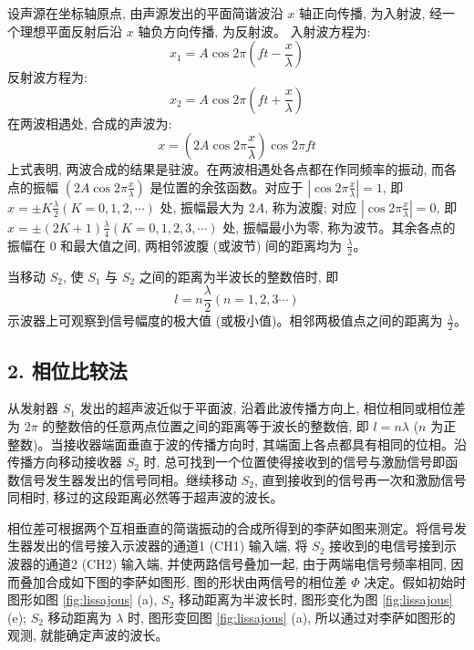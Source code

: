 \documentclass[12pt,a4paper]{article}
\begin{document}
设声源在坐标轴原点, 由声源发出的平面简谐波沿 $x$ 轴正向传播, 为入射波, 经一个理想平面反射后沿 $x$ 轴负方向传播, 为反射波。
入射波方程为:
\begin{equation} \label{eq:incident}
x_{1}=A\cos 2\pi\left(ft-\frac{x}{\lambda}\right)
\end{equation}
反射波方程为:
\begin{equation} \label{eq:reflected}
x_{2}=A\cos 2\pi\left(ft+\frac{x}{\lambda}\right)
\end{equation}
在两波相遇处, 合成的声波为:
\begin{equation} \label{eq:standing_wave}
x=\left(2A\cos 2\pi\frac{x}{\lambda}\right)\cos 2\pi ft
\end{equation}
上式表明, 两波合成的结果是驻波。在两波相遇处各点都在作同频率的振动, 而各点的振幅 $\left(2A\cos 2\pi\frac{x}{\lambda}\right)$ 是位置的余弦函数。对应于 $\left|\cos 2\pi\frac{x}{\lambda}\right|=1$, 即 $x=\pm K\frac{\lambda}{2}(K=0,1,2,\cdots)$ 处, 振幅最大为 $2A$, 称为波腹; 对应 $\left|\cos 2\pi\frac{x}{\lambda}\right|=0$, 即 $x=\pm(2K+1)\frac{\lambda}{4}(K=0,1,2,3,\cdots)$ 处, 振幅最小为零, 称为波节。其余各点的振幅在 $0$ 和最大值之间, 两相邻波腹 (或波节) 间的距离均为 $\frac{\lambda}{2}$。

当移动 $S_{2}$, 使 $S_{1}$ 与 $S_{2}$ 之间的距离为半波长的整数倍时, 即
\begin{equation} \label{eq:驻波条件}
l=n\frac{\lambda}{2}(n=1,2,3\cdots)
\end{equation}
示波器上可观察到信号幅度的极大值 (或极小值)。相邻两极值点之间的距离为 $\frac{\lambda}{2}$。

\subsection*{2. 相位比较法}
从发射器 $S_{1}$ 发出的超声波近似于平面波, 沿着此波传播方向上, 相位相同或相位差为 $2\pi$ 的整数倍的任意两点位置之间的距离等于波长的整数倍, 即 $l=n\lambda$ ($n$ 为正整数)。当接收器端面垂直于波的传播方向时, 其端面上各点都具有相同的位相。沿传播方向移动接收器 $S_{2}$ 时, 总可找到一个位置使得接收到的信号与激励信号即函数信号发生器发出的信号同相。继续移动 $S_{2}$, 直到接收到的信号再一次和激励信号同相时, 移过的这段距离必然等于超声波的波长。

相位差可根据两个互相垂直的简谐振动的合成所得到的李萨如图来测定。将信号发生器发出的信号接入示波器的通道1 (CH1) 输入端, 将 $S_{2}$ 接收到的电信号接到示波器的通道2 (CH2) 输入端, 并使两路信号叠加一起, 由于两端电信号频率相同, 因而叠加合成如下图的李萨如图形, 图的形状由两信号的相位差 $\Phi$ 决定。假如初始时图形如图 \ref{fig:lissajous} (a), $S_{2}$ 移动距离为半波长时, 图形变化为图 \ref{fig:lissajous} (e); $S_{2}$ 移动距离为 $\lambda$ 时, 图形变回图 \ref{fig:lissajous} (a), 所以通过对李萨如图形的观测, 就能确定声波的波长。
\end{document}
